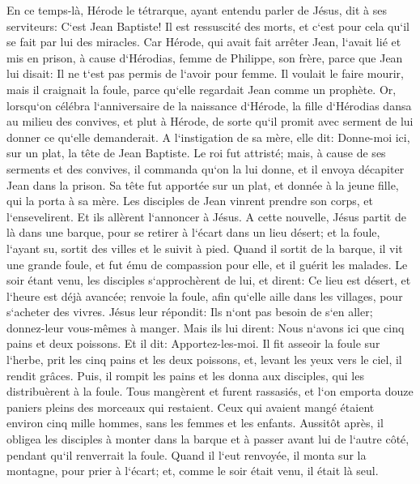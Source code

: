 \verse En ce temps-là, Hérode le tétrarque, ayant entendu parler de Jésus, dit à ses serviteurs: C`est Jean Baptiste! 
\verse Il est ressuscité des morts, et c`est pour cela qu`il se fait par lui des miracles. 
\verse Car Hérode, qui avait fait arrêter Jean, l`avait lié et mis en prison, à cause d`Hérodias, femme de Philippe, son frère, 
\verse parce que Jean lui disait: Il ne t`est pas permis de l`avoir pour femme. 
\verse Il voulait le faire mourir, mais il craignait la foule, parce qu`elle regardait Jean comme un prophète. 
\verse Or, lorsqu`on célébra l`anniversaire de la naissance d`Hérode, la fille d`Hérodias dansa au milieu des convives, et plut à Hérode, 
\verse de sorte qu`il promit avec serment de lui donner ce qu`elle demanderait. 
\verse A l`instigation de sa mère, elle dit: Donne-moi ici, sur un plat, la tête de Jean Baptiste. 
\verse Le roi fut attristé; mais, à cause de ses serments et des convives, il commanda qu`on la lui donne, 
\verse et il envoya décapiter Jean dans la prison. 
\verse Sa tête fut apportée sur un plat, et donnée à la jeune fille, qui la porta à sa mère. 
\verse Les disciples de Jean vinrent prendre son corps, et l`ensevelirent. Et ils allèrent l`annoncer à Jésus. 
\verse A cette nouvelle, Jésus partit de là dans une barque, pour se retirer à l`écart dans un lieu désert; et la foule, l`ayant su, sortit des villes et le suivit à pied. 
\verse Quand il sortit de la barque, il vit une grande foule, et fut ému de compassion pour elle, et il guérit les malades. 
\verse Le soir étant venu, les disciples s`approchèrent de lui, et dirent: Ce lieu est désert, et l`heure est déjà avancée; renvoie la foule, afin qu`elle aille dans les villages, pour s`acheter des vivres. 
\verse Jésus leur répondit: Ils n`ont pas besoin de s`en aller; donnez-leur vous-mêmes à manger. 
\verse Mais ils lui dirent: Nous n`avons ici que cinq pains et deux poissons. 
\verse Et il dit: Apportez-les-moi. 
\verse Il fit asseoir la foule sur l`herbe, prit les cinq pains et les deux poissons, et, levant les yeux vers le ciel, il rendit grâces. Puis, il rompit les pains et les donna aux disciples, qui les distribuèrent à la foule. 
\verse Tous mangèrent et furent rassasiés, et l`on emporta douze paniers pleins des morceaux qui restaient. 
\verse Ceux qui avaient mangé étaient environ cinq mille hommes, sans les femmes et les enfants. 
\verse Aussitôt après, il obligea les disciples à monter dans la barque et à passer avant lui de l`autre côté, pendant qu`il renverrait la foule. 
\verse Quand il l`eut renvoyée, il monta sur la montagne, pour prier à l`écart; et, comme le soir était venu, il était là seul. 
